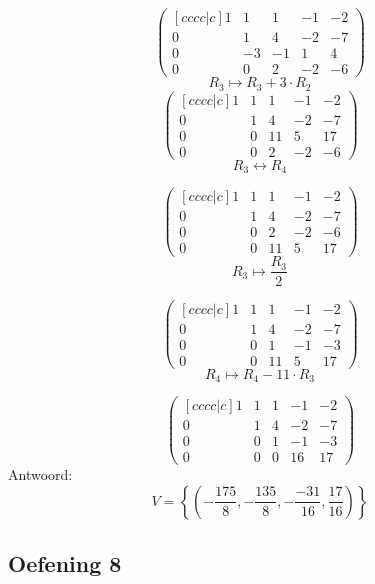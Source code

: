 \documentclass[lineaire_algebra_oplossingen.tex]{subfiles}
\begin{document}
\[
\begin{pmatrix}[cccc|c]
1 & 1 & 1 & -1 & -2\\
0 & 1 & 4 & -2 & -7\\
0 & -3 & -1 & 1 & 4\\
0 & 0 & 2 & -2 & -6
\end{pmatrix}
\]
\[ R_3 \longmapsto R_3 + 3\cdot R_2\]
\[
\begin{pmatrix}[cccc|c]
1 & 1 & 1 & -1 & -2\\
0 & 1 & 4 & -2 & -7\\
0 & 0 & 11 & 5 & 17\\
0 & 0 & 2 & -2 & -6
\end{pmatrix}
\]
\[ R_3 \leftrightarrow R_4\]

\[
\begin{pmatrix}[cccc|c]
1 & 1 & 1 & -1 & -2\\
0 & 1 & 4 & -2 & -7\\
0 & 0 & 2 & -2 & -6\\
0 & 0 & 11 & 5 & 17
\end{pmatrix}
\]
\[ R_3 \longmapsto  \frac{R_3}{2}
\]

\[
\begin{pmatrix}[cccc|c]
1 & 1 & 1 & -1 & -2\\
0 & 1 & 4 & -2 & -7\\
0 & 0 & 1 & -1 & -3\\
0 & 0 & 11 & 5 & 17
\end{pmatrix}
\]
\[ R_4 \longmapsto R_4 - 11\cdot R_3\]

\[
\begin{pmatrix}[cccc|c]
1 & 1 & 1 & -1 & -2\\
0 & 1 & 4 & -2 & -7\\
0 & 0 & 1 & -1 & -3\\
0 & 0 & 0 & 16 & 17
\end{pmatrix}
\]
Antwoord:
\[
V = \left\{\left( -\frac{175}{8},-\frac{135}{8}, -\frac{-31}{16}, \frac{17}{16} \right)\right\}
\]
\subsection{Oefening 8}
\end{document}
